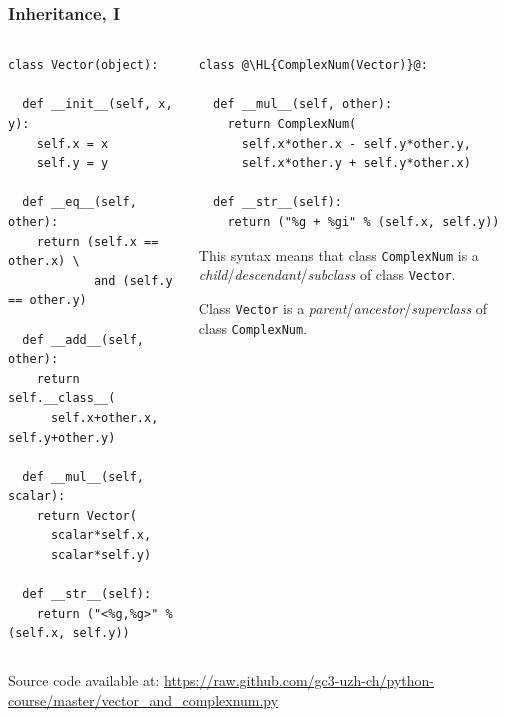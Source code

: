 \documentclass[english,serif,mathserif,xcolor=pdftex,dvipsnames,table]{beamer}
\begin{document}
\begin{frame}[fragile]
  \frametitle{Inheritance, I}

  \begin{columns}[t]
    \begin{column}{0.5\textwidth}
\begin{lstlisting}[basicstyle=\tiny\ttfamily,showstringspaces=false]
class Vector(object):

  def __init__(self, x, y):
    self.x = x
    self.y = y

  def __eq__(self, other):
    return (self.x == other.x) \
            and (self.y == other.y)

  def __add__(self, other):
    return self.__class__(
      self.x+other.x, self.y+other.y)

  def __mul__(self, scalar):
    return Vector(
      scalar*self.x,
      scalar*self.y)

  def __str__(self):
    return ("<%g,%g>" % (self.x, self.y))
\end{lstlisting}
    \end{column}
    \begin{column}{0.5\textwidth}
\begin{lstlisting}[basicstyle=\tiny\ttfamily,showstringspaces=false]
class @\HL{ComplexNum(Vector)}@:

  def __mul__(self, other):
    return ComplexNum(
      self.x*other.x - self.y*other.y,
      self.x*other.y + self.y*other.x)

  def __str__(self):
    return ("%g + %gi" % (self.x, self.y))
\end{lstlisting}

      \+
      This syntax means that class \texttt{ComplexNum} is a
      \emph{child}/\emph{descendant}/\emph{subclass} of class \texttt{Vector}.

      \+
      Class \texttt{Vector} is a
      \emph{parent}/\emph{ancestor}/\emph{superclass} of class
      \texttt{ComplexNum}.
    \end{column}
  \end{columns}

  \+
  {\scriptsize Source code available at:
    \url{https://raw.github.com/gc3-uzh-ch/python-course/master/vector_and_complexnum.py}}
\end{frame}
\end{document}
